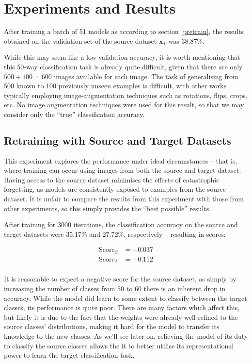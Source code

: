 \documentclass{report}
\newcommand{\SCORE}[2]{
	\begin{align*}
	\text{Score}_S &= #1 \\
	\text{Score}_T &= #2 \\
	\end{align*}
}
\begin{document}
	\section{Experiments and Results}
	After training a batch of 51 models as according to section \ref{pretrain}, the results obtained on the validation set of the source dataset $\bm{x}_T$ was 38.87\%. \par
	While this may seem like a low validation accuracy, it is worth mentioning that this 50-way classification task is already quite difficult, given that there are only $500+100=600$ images available for each image. The task of generalising from 500 known to 100 previously unseen examples is difficult, with other works typically employing image-augmentation techniques such as rotations, flips, crops, etc. No image augmentation techniques were used for this result, so that we may consider only the ``true'' classification accuracy. \par
	
	\subsection{Retraining with Source and Target Datasets}
	This experiment explores the performance under ideal circumstances -- that is, where training can occur using images from both the source and target dataset. Having access to the source dataset minimises the effects of catastrophic forgetting, as models are consistently exposed to examples from the source dataset. It is unfair to compare the results from this experiment with those from other experiments, so this simply provides the ``best possible'' results. \par
	After training for 3000 iterations, the classification accuracy on the source and target datasets were 35.17\% and 27.72\%, respectively -- resulting in scores:
	\SCORE{-0.037}{-0.112}
	
	It is reasonable to expect a negative score for the source dataset, as simply by increasing the number of classes from 50 to 60 there is an inherent drop in accuracy. While the model did learn to some extent to classify between the target classes, its performance is quite poor. There are many factors which affect this, but likely it is due to the fact that the weights were already well-refined to the source classes' distributions, making it hard for the model to transfer its knowledge to the new classes. As we'll see later on, relieving the model of its duty to classify the source classes allows the it to better utilise its representational power to learn the target classification task. \par
\end{document}
